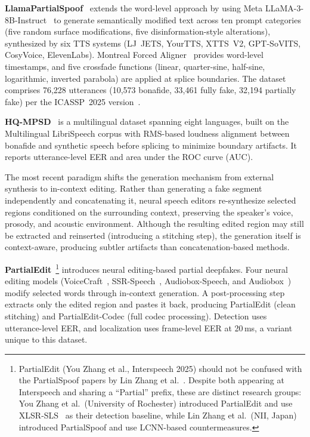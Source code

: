 \documentclass[journal]{IEEEtran}
\begin{document}
\textbf{LlamaPartialSpoof}~\cite{luong2025llamapartialspoof} extends the word-level approach by using Meta LLaMA-3-8B-Instruct~\cite{grattafiori2024llama3} to generate semantically modified text across ten prompt categories (five random surface modifications, five disinformation-style alterations), synthesized by six TTS systems (LJ~JETS, YourTTS, XTTS~V2, GPT-SoVITS, CosyVoice, ElevenLabs). Montreal Forced Aligner~\cite{mcauliffe2017mfa} provides word-level timestamps, and five crossfade functions (linear, quarter-sine, half-sine, logarithmic, inverted parabola) are applied at splice boundaries. The dataset comprises 76,228 utterances (10,573 bonafide, 33,461 fully fake, 32,194 partially fake) per the ICASSP~2025 version~\cite{luong2025llamapartialspoof}.

\textbf{HQ-MPSD}~\cite{li2025hqmpsd} is a multilingual dataset spanning eight languages, built on the Multilingual LibriSpeech corpus with RMS-based loudness alignment between bonafide and synthetic speech before splicing to minimize boundary artifacts. It reports utterance-level EER and area under the ROC curve (AUC).

The most recent paradigm shifts the generation mechanism from external synthesis to in-context editing. Rather than generating a fake segment independently and concatenating it, neural speech editors re-synthesize selected regions conditioned on the surrounding context, preserving the speaker's voice, prosody, and acoustic environment. Although the resulting edited region may still be extracted and reinserted (introducing a stitching step), the generation itself is context-aware, producing subtler artifacts than concatenation-based methods.

\textbf{PartialEdit}~\cite{zhang2025partialedit}\footnote{PartialEdit (You Zhang et al., Interspeech 2025) should not be confused with the PartialSpoof papers by Lin Zhang et al.~\cite{zhang2021initialinvestigation,zhang2023partialspoof}. Despite both appearing at Interspeech and sharing a ``Partial'' prefix, these are distinct research groups: You Zhang et al.\ (University of Rochester) introduced PartialEdit and use XLSR-SLS~\cite{zhang2024xlrsls} as their detection baseline, while Lin Zhang et al.\ (NII, Japan) introduced PartialSpoof and use LCNN-based countermeasures.} introduces neural editing-based partial deepfakes. Four neural editing models (VoiceCraft~\cite{peng2024voicecraft}, SSR-Speech~\cite{wang2025ssrspeech}, Audiobox-Speech, and Audiobox~\cite{vyas2023audiobox}) modify selected words through in-context generation. A post-processing step extracts only the edited region and pastes it back, producing PartialEdit (clean stitching) and PartialEdit-Codec (full codec processing). Detection uses utterance-level EER, and localization uses frame-level EER at 20\,ms, a variant unique to this dataset.
\end{document}
